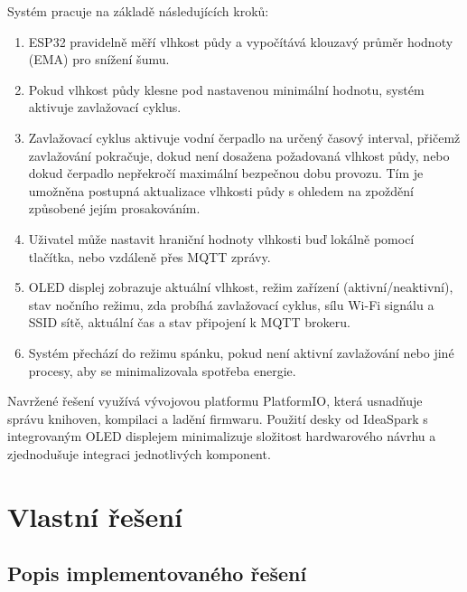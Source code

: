 \documentclass[a4paper, 11pt]{article}
\begin{document}
Systém pracuje na základě následujících kroků:
\begin{enumerate}
    \item ESP32 pravidelně měří vlhkost půdy a vypočítává klouzavý průměr hodnoty (EMA) pro snížení šumu.
    \item Pokud vlhkost půdy klesne pod nastavenou minimální hodnotu, systém aktivuje zavlažovací cyklus.
    \item Zavlažovací cyklus aktivuje vodní čerpadlo na určený časový interval, přičemž zavlažování pokračuje, dokud není dosažena požadovaná vlhkost půdy, nebo dokud čerpadlo nepřekročí maximální bezpečnou dobu provozu. Tím je umožněna postupná aktualizace vlhkosti půdy s ohledem na zpoždění způsobené jejím prosakováním.
    \item Uživatel může nastavit hraniční hodnoty vlhkosti buď lokálně pomocí tlačítka, nebo vzdáleně přes MQTT zprávy.
    \item OLED displej zobrazuje aktuální vlhkost, režim zařízení (aktivní/neaktivní), stav nočního režimu, zda probíhá zavlažovací cyklus, sílu Wi-Fi signálu a SSID sítě, aktuální čas a stav připojení k MQTT brokeru. 
    \item Systém přechází do režimu spánku, pokud není aktivní zavlažování nebo jiné procesy, aby se minimalizovala spotřeba energie.
\end{enumerate}

Navržené řešení využívá vývojovou platformu PlatformIO, která usnadňuje správu knihoven, kompilaci a ladění firmwaru. 
Použití desky od IdeaSpark s integrovaným OLED displejem minimalizuje složitost hardwarového návrhu a zjednodušuje integraci jednotlivých komponent.

\section{Vlastní řešení}

\subsection{Popis implementovaného řešení}
\end{document}
